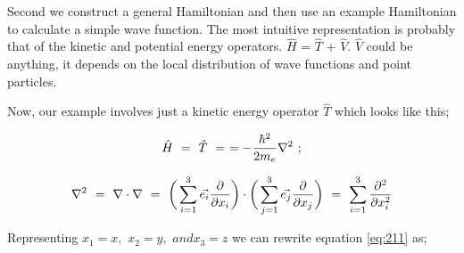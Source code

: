 \documentclass{article}
\begin{document}
Second we construct a general Hamiltonian and then use an example Hamiltonian to calculate a simple wave function. The most intuitive representation is probably that of the kinetic and potential energy operators. \begin{math} \hat{H} \end{math} = \begin{math} \hat{T} \end{math} + \begin{math} \hat{V} \end{math}. \begin{math} \hat{V} \end{math} could be anything, it depends on the local distribution of wave functions and point particles.  

Now, our example involves just a kinetic energy operator \begin{math} \hat{T} \end{math} which looks like this;

\begin{equation} \label{eq:210}
\hat{H} \hspace{0.125cm} = \hspace{0.125cm} \hat{T} \hspace{0.125cm} = \hspace{0.125cm} = -\frac{\hbar^2}{2m_{e}}\nabla^2 \hspace{0.125cm} ; 
\end{equation}

\begin{equation} \label{eq:211}
\nabla^2 \hspace{0.125cm} = \hspace{0.125cm} \nabla \cdot \nabla \hspace{0.125cm} = \hspace{0.125cm} \bigg( \sum_{i=1}^{3}\vec{e_i}\frac{\partial{}}{\partial{x_i}} \bigg) \cdot \bigg( \sum_{j=1}^{3}\vec{e_j}\frac{\partial{}}{\partial{x_j}} \bigg) \hspace{0.125cm} = \hspace{0.125cm} \sum_{i=1}^{3}\frac{\partial^{2}}{\partial{x_i^2}}
\end{equation}

Representing \begin{math} x_1 = x, \end{math} \begin{math} x_2 = y, \end{math} \begin{math} and x_3 = z \end{math} we can rewrite equation \ref{eq:211} as;
\end{document}
